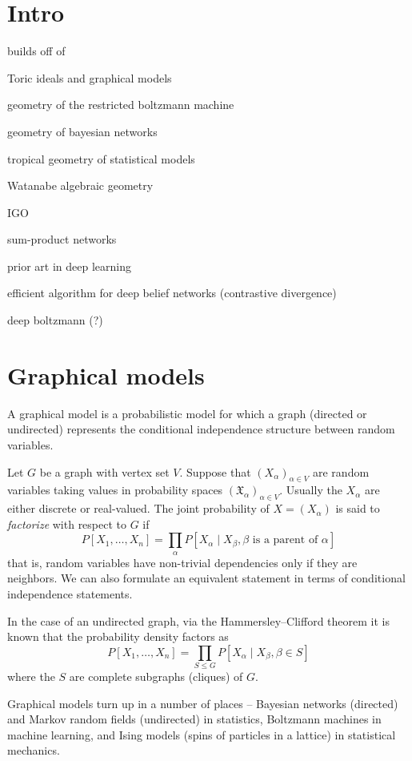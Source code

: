 \documentclass[11pt]{article}
\newcommand*{\X}{\mathfrak{X}}
\begin{document}
\section{Intro}

builds off of

Toric ideals and graphical models

geometry of the restricted boltzmann machine

geometry of bayesian networks

tropical geometry of statistical models

\linespace
Watanabe algebraic geometry

IGO

\linespace
sum-product networks

\linespace
\noindent prior art in deep learning

efficient algorithm for deep belief networks (contrastive divergence)

deep boltzmann (?)


\section{Graphical models}

A graphical model is a probabilistic model for which a graph (directed or
undirected) represents the conditional independence structure between random
variables. 

Let $G$ be a graph with vertex set $V$.  Suppose that $(X_\alpha)_{\alpha \in
V}$ are random variables taking values in probability spaces
$(\X_\alpha)_{\alpha \in V}$.  Usually the $X_\alpha$ are either discrete or
real-valued.  The joint probability of $X = (X_\alpha)$ is said to
\emph{factorize} with respect to $G$ if
\[
    P[X_1, \ldots, X_n] = 
        \prod_\alpha P[X_\alpha \mid X_\beta, \beta \text{ is a parent of }
        \alpha]
\]
that is, random variables have non-trivial dependencies only if they are
neighbors.  We can also formulate an equivalent statement in terms of
conditional independence statements.

In the case of an undirected graph, via the Hammersley–Clifford theorem it is
known that the probability density factors as
\[
    P[X_1, \ldots, X_n] = 
        \prod_{S \le G} P[X_\alpha \mid X_\beta, \beta \in S]
\]
where the $S$ are complete subgraphs (cliques) of $G$.

Graphical models turn up in a number of places -- Bayesian networks (directed)
and Markov random fields (undirected) in statistics, Boltzmann machines in
machine learning, and Ising models (spins of particles in a lattice) in
statistical mechanics.
\end{document}
